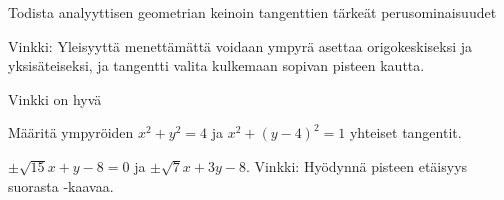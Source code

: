 \begin{tehtavasivu}
\begin{tehtava}
Todista analyyttisen geometrian keinoin tangenttien tärkeät perusominaisuudet
\begin{alakohdat}
\end{alakohdat}
Vinkki: Yleisyyttä menettämättä voidaan ympyrä asettaa origokeskiseksi ja yksisäteiseksi, ja tangentti valita kulkemaan sopivan pisteen kautta.
\begin{vastaus}
Vinkki on hyvä
\end{vastaus}
\end{tehtava}

\begin{tehtava}
Määritä ympyröiden $x^2+y^2 = 4$ ja $x^2+(y-4)^2 = 1$ yhteiset tangentit.

\begin{vastaus}
$\pm\sqrt{15}x+y-8= 0$ ja $\pm\sqrt{7}x+3y-8$. Vinkki: Hyödynnä pisteen etäisyys suorasta -kaavaa.
\end{vastaus}
\end{tehtava}


\end{tehtavasivu}